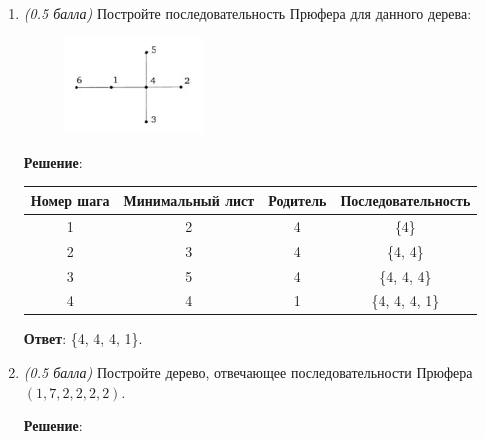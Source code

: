 \documentclass{article}
\begin{document}
\begin{enumerate}
    \item \textit{(0.5 балла)} Постройте последовательность Прюфера для данного дерева:
    
    \begin{figure}[h]
        \centering
        \includegraphics[width=0.35\textwidth]{images/12.5.png}
    \end{figure}

    \textbf{Решение}:
    
    \begin{table}[h]
        \centering
        \begin{tabular}{|c|c|c|c|}
            \hline
            Номер шага & Минимальный лист & Родитель & Последовательность \\
            \hline
            1 & 2 & 4 & \{4\} \\
            \hline
            2 & 3 & 4 & \{4, 4\} \\
            \hline
            3 & 5 & 4 & \{4, 4, 4\} \\
            \hline
            4 & 4 & 1 & \{4, 4, 4, 1\} \\
            \hline
        \end{tabular}
    \end{table}
    
    \textbf{Ответ}: \{4, 4, 4, 1\}.

    \item \textit{(0.5 балла)} Постройте дерево, отвечающее последовательности Прюфера $(1, 7, 2, 2, 2, 2)$.
    
    \textbf{Решение}:
    

\end{enumerate}
\end{document}
